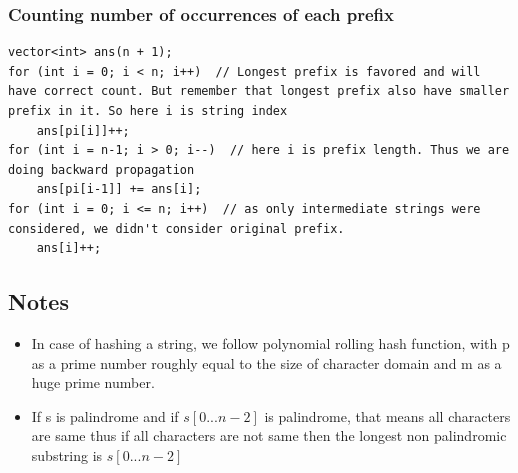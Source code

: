 \documentclass[8pt, a4paper, oneside, twocolumn]{extarticle}
\begin{document}
\subsubsection{Counting number of occurrences of each prefix}
\begin{verbatim}
vector<int> ans(n + 1);
for (int i = 0; i < n; i++)  // Longest prefix is favored and will have correct count. But remember that longest prefix also have smaller prefix in it. So here i is string index
    ans[pi[i]]++;
for (int i = n-1; i > 0; i--)  // here i is prefix length. Thus we are doing backward propagation
    ans[pi[i-1]] += ans[i];
for (int i = 0; i <= n; i++)  // as only intermediate strings were considered, we didn't consider original prefix.
    ans[i]++;
\end{verbatim}
\subsection{Notes}
\begin{itemize}
	\item In case of hashing a string, we follow polynomial rolling hash function, with p as a prime number roughly equal to the size of character domain and m as a huge prime number.
	\item If s is palindrome and if $s[0...n - 2]$ is palindrome, that means all characters are same thus if all characters are not same then the longest non palindromic substring is $s[0...n - 2]$
\end{itemize}
\end{document}
